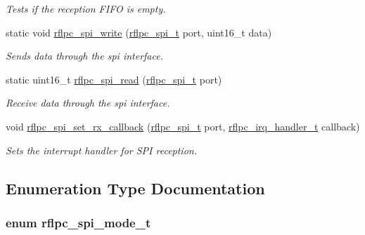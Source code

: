 \begin{DoxyCompactItemize}
\begin{DoxyCompactList}\small\item\em Tests if the reception F\-I\-F\-O is empty. \end{DoxyCompactList}\item 
static void \hyperlink{group__spi_ga86d87ed42140ef44d673a16d7bcf555f}{rflpc\-\_\-spi\-\_\-write} (\hyperlink{group__spi_gacd0981a3c68e5b6af8c07d7638cb9156}{rflpc\-\_\-spi\-\_\-t} port, uint16\-\_\-t data)
\begin{DoxyCompactList}\small\item\em Sends data through the spi interface. \end{DoxyCompactList}\item 
static uint16\-\_\-t \hyperlink{group__spi_ga976b4ee1c4153eab4f477257371998a1}{rflpc\-\_\-spi\-\_\-read} (\hyperlink{group__spi_gacd0981a3c68e5b6af8c07d7638cb9156}{rflpc\-\_\-spi\-\_\-t} port)
\begin{DoxyCompactList}\small\item\em Receive data through the spi interface. \end{DoxyCompactList}\item 
void \hyperlink{group__spi_ga1054c25b01b178e15055f90667199a8e}{rflpc\-\_\-spi\-\_\-set\-\_\-rx\-\_\-callback} (\hyperlink{group__spi_gacd0981a3c68e5b6af8c07d7638cb9156}{rflpc\-\_\-spi\-\_\-t} port, \hyperlink{group__irq_ga4970a8a2cf9b63e4c261982504669a1f}{rflpc\-\_\-irq\-\_\-handler\-\_\-t} callback)
\begin{DoxyCompactList}\small\item\em Sets the interrupt handler for S\-P\-I reception. \end{DoxyCompactList}\end{DoxyCompactItemize}


\subsection{Enumeration Type Documentation}
\hypertarget{group__spi_gacdd9f294e5d1e913729ec8a9bb715e37}{
\subsubsection[{rflpc\-\_\-spi\-\_\-mode\-\_\-t}]{\setlength{\rightskip}{0pt plus 5cm}enum {\bf rflpc\-\_\-spi\-\_\-mode\-\_\-t}}}\label{group__spi_gacdd9f294e5d1e913729ec8a9bb715e37}


